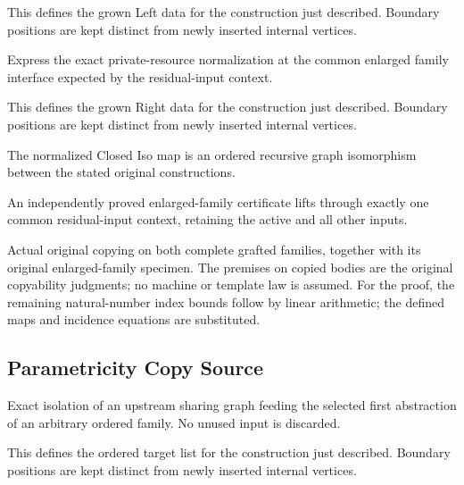 This defines the grown Left data for the construction just described. Boundary positions are kept distinct from newly inserted internal vertices.
\par{}

Express the exact private-resource normalization at the common enlarged family interface expected by the residual-input context.
\par{}

This defines the grown Right data for the construction just described. Boundary positions are kept distinct from newly inserted internal vertices.
\par{}

The normalized Closed Iso map is an ordered recursive graph isomorphism between the stated original constructions.
\par{}

An independently proved enlarged-family certificate lifts through exactly one common residual-input context, retaining the active and all other inputs.
\par{}

Actual original copying on both complete grafted families, together with its original enlarged-family specimen. The premises on copied bodies are the original copyability judgments; no machine or template law is assumed.
For the proof, the remaining natural-number index bounds follow by linear arithmetic; the defined maps and incidence equations are substituted.
\par{}

\subsection{Parametricity Copy Source}
Exact isolation of an upstream sharing graph feeding the selected first abstraction of an arbitrary ordered family. No unused input is discarded.

This defines the ordered target list for the construction just described. Boundary positions are kept distinct from newly inserted internal vertices.
\par{}

